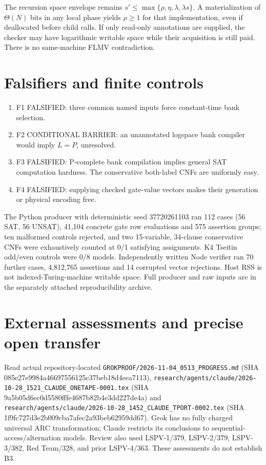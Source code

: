 \documentclass[11pt]{article}
\begin{document}
The recursion space envelope remains $s'\le\max\{\rho,\eta,\lambda,\lambda s\}$. A materialization of $\Theta(N)$ bits in any local phase yields $\rho\ge1$ for that implementation, even if deallocated before child calls. If only read-only annotations are supplied, the checker may have logarithmic writable space while their acquisition is still paid. There is no same-machine FLMV contradiction.

\section*{Falsifiers and finite controls}
\begin{enumerate}
\item[] F1 FALSIFIED: three common named inputs force constant-time bank selection.
\item[] F2 CONDITIONAL BARRIER: an unannotated logspace bank compiler would imply $L=P$, unresolved.
\item[] F3 FALSIFIED: P-complete bank compilation implies general SAT computation hardness. The conservative both-label CNFs are uniformly easy.
\item[] F4 FALSIFIED: supplying checked gate-value vectors makes their generation or physical encoding free.
\end{enumerate}
The Python producer with deterministic seed 37720261103 ran 112 cases (56 SAT, 56 UNSAT), 41,104 concrete gate row evaluations and 575 assertion groups; ten malformed controls rejected, and two 15-variable, 34-clause conservative CNFs were exhaustively counted at 0/1 satisfying assignments. K4 Tseitin odd/even controls were 0/8 models. Independently written Node verifier ran 70 further cases, 4,812,765 assertions and 14 corrupted vector rejections. Host RSS is not indexed-Turing-machine writable space. Full producer and raw inputs are in the separately attached reproducibility archive.

\section*{External assessments and precise open transfer}
Read actual repository-located \texttt{GROKPROOF/2026-11-04\_0513\_PROGRESS.md} (SHA 085e27e9984a46697556125c37beb18d4eea7113), \texttt{research/agents/claude/2026-10-28\_1521\_CLAUDE\_ONETAPE-0001.tex} (SHA 9a5b05d6ec0d5580fffe4687b82b4e3dd227de4a) and \texttt{research/agents/claude/2026-10-28\_1452\_CLAUDE\_TPORT-0002.tex} (SHA 1f9fc727d3e2b009cba7afec2a93beb62959dd67). Grok has no fully charged universal ARC transformation; Claude restricts its conclusions to sequential-access/alternation models. Review also used LSPV-1/379, LSPV-2/379, LSPV-3/382, Red Team/328, and prior LSPV-4/363. These assessments do not establish B3.
\end{document}

